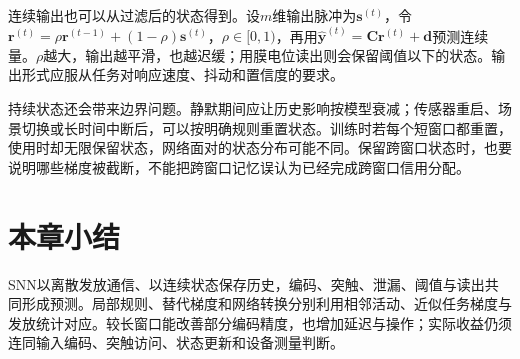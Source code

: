 连续输出也可以从过滤后的状态得到。设$m$维输出脉冲为$\bm s^{(t)}$，令$\bm r^{(t)}=\rho\bm r^{(t-1)}+(1-\rho)\bm s^{(t)}$，$\rho\in[0,1)$，再用$\hat{\bm y}^{(t)}=\bm C\bm r^{(t)}+\bm d$预测连续量。$\rho$越大，输出越平滑，也越迟缓；用膜电位读出则会保留阈值以下的状态。输出形式应服从任务对响应速度、抖动和置信度的要求。

持续状态还会带来边界问题。静默期间应让历史影响按模型衰减；传感器重启、场景切换或长时间中断后，可以按明确规则重置状态。训练时若每个短窗口都重置，使用时却无限保留状态，网络面对的状态分布可能不同。保留跨窗口状态时，也要说明哪些梯度被截断，不能把跨窗口记忆误认为已经完成跨窗口信用分配。

\section{本章小结}
\label{sec:snn-summary}

SNN以离散发放通信、以连续状态保存历史，编码、突触、泄漏、阈值与读出共同形成预测。局部规则、替代梯度和网络转换分别利用相邻活动、近似任务梯度与发放统计对应。较长窗口能改善部分编码精度，也增加延迟与操作；实际收益仍须连同输入编码、突触访问、状态更新和设备测量判断。
